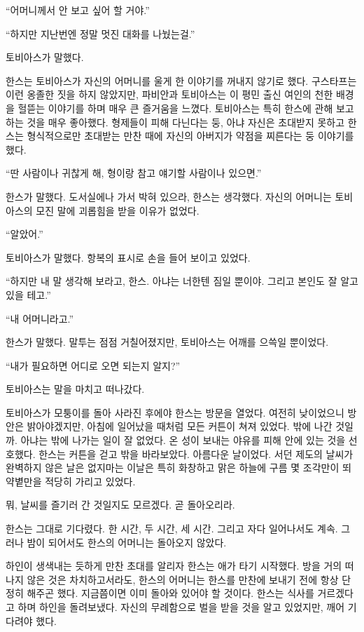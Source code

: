``어머니께서 안 보고 싶어 할 거야.''

``하지만 지난번엔 정말 멋진 대화를 나눴는걸.''

토비아스가 말했다.

한스는 토비아스가 자신의 어머니를 울게 한 이야기를 꺼내지 않기로 했다. 구스타프는 이런 옹졸한 짓을 하지 않았지만, 파비안과 토비아스는 이 평민 출신 여인의 천한 배경을 헐뜯는 이야기를 하며 매우 큰 즐거움을 느꼈다. 토비아스는 특히 한스에 관해 보고하는 것을 매우 좋아했다. 형제들이 피해 다닌다는 둥, 아냐 자신은 초대받지 못하고 한스는 형식적으로만 초대받는 만찬 때에 자신의 아버지가 약점을 찌른다는 둥 이야기를 했다.

``딴 사람이나 귀찮게 해, 형이랑 참고 얘기할 사람이나 있으면.''

한스가 말했다. 도서실에나 가서 박혀 있으라, 한스는 생각했다. 자신의 어머니는 토비아스의 모진 말에 괴롭힘을 받을 이유가 없었다.

``알았어.''

토비아스가 말했다. 항복의 표시로 손을 들어 보이고 있었다.

``하지만 내 말 생각해 보라고, 한스. 아냐는 너한텐 짐일 뿐이야. 그리고 본인도 잘 알고 있을 테고.''

``내 어머니라고.''

한스가 말했다. 말투는 점점 거칠어졌지만, 토비아스는 어깨를 으쓱일 뿐이었다.

``내가 필요하면 어디로 오면 되는지 알지?''

토비아스는 말을 마치고 떠나갔다.

토비아스가 모퉁이를 돌아 사라진 후에야 한스는 방문을 열었다. 여전히 낮이었으니 방 안은 밝아야겠지만, 아침에 일어났을 때처럼 모든 커튼이 쳐져 있었다. 밖에 나간 것일까. 아냐는 밖에 나가는 일이 잘 없었다. 온 성이 보내는 야유를 피해 안에 있는 것을 선호했다. 한스는 커튼을 걷고 밖을 바라보았다. 아름다운 날이었다. 서던 제도의 날씨가 완벽하지 않은 날은 없지마는 이날은 특히 화창하고 맑은 하늘에 구름 몇 조각만이 뙤약볕만을 적당히 가리고 있었다.

뭐, 날씨를 즐기러 간 것일지도 모르겠다. 곧 돌아오리라.

한스는 그대로 기다렸다. 한 시간, 두 시간, 세 시간. 그리고 자다 일어나서도 계속. 그러나 밤이 되어서도 한스의 어머니는 돌아오지 않았다.

하인이 생색내는 듯하게 만찬 초대를 알리자 한스는 애가 타기 시작했다. 방을 거의 떠나지 않은 것은 차치하고서라도, 한스의 어머니는 한스를 만찬에 보내기 전에 항상 단정히 해주곤 했다. 지금쯤이면 이미 돌아와 있어야 할 것이다. 한스는 식사를 거르겠다고 하며 하인을 돌려보냈다. 자신의 무례함으로 벌을 받을 것을 알고 있었지만, 깨어 기다려야 했다.

